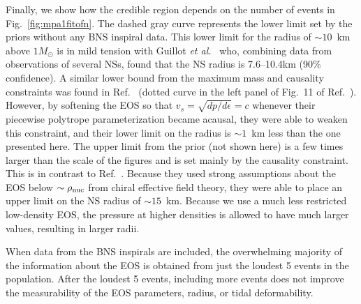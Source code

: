 \documentclass[twocolumn,prd,amssymb,aps,nofootinbib,showpacs,epsf]{revtex4}
\begin{document}
Finally, we show how the credible region depends on the number of events in Fig.~\ref{fig:mpa1fitofn}. The dashed gray curve represents the lower limit set by the priors without any BNS inspiral data. This lower limit for the radius of $\sim 10$~km above $1M_\odot$ is in mild tension with Guillot {\it et al.}~\cite{GuillotServillatWebb2013} who, combining data from observations of several NSs, found that the NS radius is 7.6--10.4km (90\% confidence). A similar lower bound from the maximum mass and causality constraints was found in Ref.~\cite{HebelerLattimerPethick2013} (dotted curve in the left panel of Fig.~11 of Ref.~\cite{HebelerLattimerPethick2013}). However, by softening the EOS so that $v_s = \sqrt{dp/d\epsilon} = c$ whenever their piecewise polytrope parameterization became acausal, they were able to weaken this constraint, and their lower limit on the radius is $\sim 1$~km less than the one presented here. The upper limit from the prior (not shown here) is a few times larger than the scale of the figures and is set mainly by the causality constraint. This is in contrast to Ref.~\cite{HebelerLattimerPethick2013}. Because they used strong assumptions about the EOS below $\sim \rho_{\rm nuc}$ from chiral effective field theory, they were able to place an upper limit on the NS radius of $\sim 15$~km. Because we use a much less restricted low-density EOS, the pressure at higher densities is allowed to have much larger values, resulting in larger radii.

When data from the BNS inspirals are included, the overwhelming majority of the information about the EOS is obtained from just the loudest 5 events in the population. After the loudest 5 events, including more events does not improve the measurability of the EOS parameters, radius, or tidal deformability.
\end{document}
